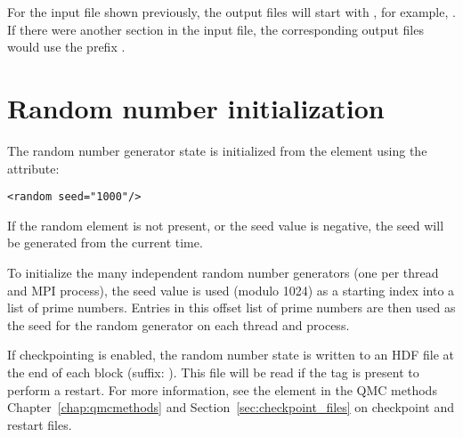 For the input file shown previously, the output files will start with , for example, .
If there were another  section in the input file, the corresponding output files would use the prefix .



\section{Random number initialization}

The random number generator state is initialized from the  element using the  attribute:
\begin{lstlisting}[style=QMCPXML]
<random seed="1000"/>
\end{lstlisting}

If the random element is not present, or the seed value is negative, the seed will be generated from the current time.

To initialize the many independent random number generators (one per thread and MPI process), the seed value is used (modulo 1024) as a starting index into a list of prime numbers.
Entries in this offset list of prime numbers are then used as the seed for the random generator on each thread and process.

If checkpointing is enabled, the random number state is written to an HDF file at the end of each block (suffix: ).
This file will be read if the  tag is present to perform a restart.
For more information, see the  element in the QMC methods Chapter~\ref{chap:qmcmethods} and Section~\ref{sec:checkpoint_files} on checkpoint and restart files.
